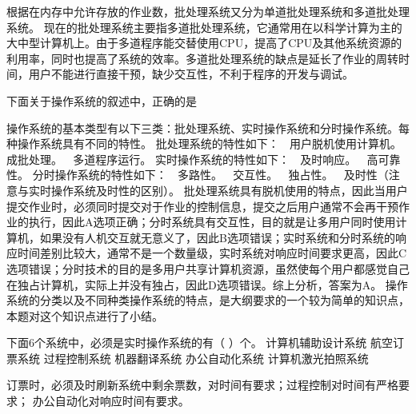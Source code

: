 \begin{solution}根据在内存中允许存放的作业数，批处理系统又分为单道批处理系统和多道批处理系统。
现在的批处理系统主要指多道批处理系统，它通常用在以科学计算为主的大中型计算机上。由于多道程序能交替使用CPU，提高了CPU及其他系统资源的利用率，同时也提高了系统的效率。多道批处理系统的缺点是延长了作业的周转时间，用户不能进行直接干预，缺少交互性，不利于程序的开发与调试。
\end{solution}
\question 下面关于操作系统的叙述中，正确的是
\par{}
\begin{solution}操作系统的基本类型有以下三类：批处理系统、实时操作系统和分时操作系统。每种操作系统具有不同的特性。
批处理系统的特性如下：  用户脱机使用计算机。  成批处理。 
多道程序运行。 实时操作系统的特性如下：  及时响应。  高可靠性。
分时操作系统的特性如下：  多路性。  交互性。  独占性。 
及时性（注意与实时操作系统及时性的区别）。
批处理系统具有脱机使用的特点，因此当用户提交作业时，必须同时提交对于作业的控制信息，提交之后用户通常不会再干预作业的执行，因此A选项正确；分时系统具有交互性，目的就是让多用户同时使用计算机，如果没有人机交互就无意义了，因此B选项错误；实时系统和分时系统的响应时间差别比较大，通常不是一个数量级，实时系统对响应时间要求更高，因此C选项错误；分时技术的目的是多用户共享计算机资源，虽然使每个用户都感觉自己在独占计算机，实际上并没有独占，因此D选项错误。综上分析，答案为A。
操作系统的分类以及不同种类操作系统的特点，是大纲要求的一个较为简单的知识点，本题对这个知识点进行了小结。
\end{solution}
\question 下面6个系统中，必须是实时操作系统的有（ ）个。 计算机辅助设计系统
航空订票系统 过程控制系统 机器翻译系统 办公自动化系统 计算机激光拍照系统
\par{}
\begin{solution}订票时，必须及时刷新系统中剩余票数，对时间有要求；过程控制对时间有严格要求；
办公自动化对响应时间有要求。
\end{solution}
